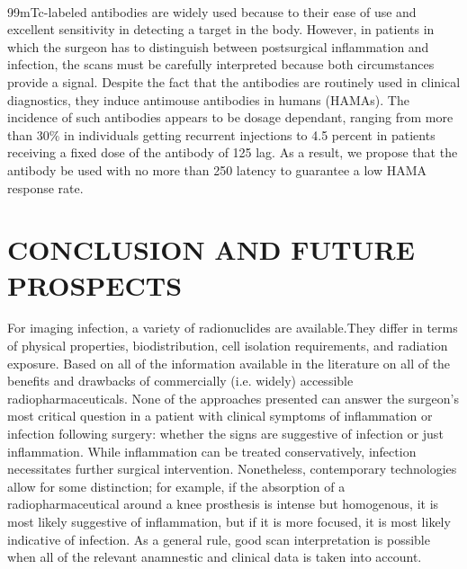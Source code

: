 \documentclass[12pt]{article}
\begin{document}
\\99mTc-labeled antibodies are widely used because to their ease of use and excellent sensitivity in detecting a target in the body. However, in patients in which the surgeon has to distinguish between postsurgical inflammation and infection, the scans must be carefully interpreted because both circumstances provide a signal. Despite the fact that the antibodies are routinely used in clinical diagnostics, they induce antimouse antibodies in humans (HAMAs). The incidence of such antibodies appears to be dosage dependant, ranging from more than 30$\%$ in individuals getting recurrent injections to 4.5 percent in patients receiving a fixed dose of the antibody of 125 lag. As a result, we propose that the antibody be used with no more than 250 latency to guarantee a low HAMA response rate.
\section{CONCLUSION AND FUTURE PROSPECTS}
For imaging infection, a variety of radionuclides are available.They differ in terms of physical properties, biodistribution, cell isolation requirements, and radiation exposure. Based on all of the information available in the literature on all of the benefits and drawbacks of commercially (i.e. widely) accessible radiopharmaceuticals. None of the approaches presented can answer the surgeon's most critical question in a patient with clinical symptoms of inflammation or infection following surgery: whether the signs are suggestive of infection or just inflammation. While inflammation can be treated conservatively, infection necessitates further surgical intervention. Nonetheless, contemporary technologies allow for some distinction; for example, if the absorption of a radiopharmaceutical around a knee prosthesis is intense but homogenous, it is most likely suggestive of inflammation, but if it is more focused, it is most likely indicative of infection. As a general rule, good scan interpretation is possible when all of the relevant anamnestic and clinical data is taken into account.
\end{document}
